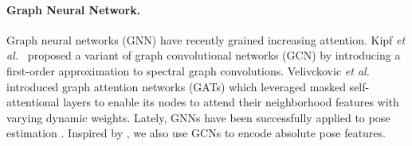 \documentclass[10pt,twocolumn,letterpaper]{article}
\newcommand{\et}{{\em et al.\ }}
\begin{document}
\paragraph{\textbf{Graph Neural Network.}}
Graph neural networks (GNN) \cite{Wu2019a,niepert2016learning,velivckovic2017graph,kipf2016semisupervised,xu2018how,hamilton2017inductive} have recently grained increasing attention. Kipf \et \cite{kipf2016semisupervised} proposed a variant of graph convolutional networks (GCN) by introducing a first-order approximation to spectral graph convolutions. Velivckovic \et \cite{velivckovic2017graph} introduced graph attention networks (GATs) which leveraged masked self-attentional layers to enable its nodes to attend their neighborhood features with varying dynamic weights. Lately, GNNs have been successfully applied to pose estimation \cite{liu2020gastnet,Zhao_2019}. Inspired by \cite{liu2020gastnet,Zhao_2019}, we also use GCNs to encode absolute pose features.
\end{document}
